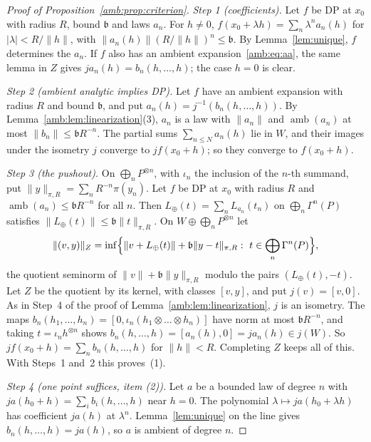 \documentclass[11pt]{amsart}
\theoremstyle{definition}
\theoremstyle{remark}
\numberwithin{equation}{section}
\newcommand{\abs}[1]{\lvert #1\rvert}
\newcommand{\norm}[1]{\lVert #1\rVert}
\theoremstyle{plain}
\theoremstyle{definition}
\theoremstyle{plain}
\begin{document}
\begin{proof}[Proof of Proposition~\ref{amb:prop:criterion}]
\emph{Step 1 (coefficients).} Let $f$ be DP at $x_0$ with radius $R$, bound $\mathfrak b$ and laws $a_n$. For $h\ne0$, $f(x_0+\lambda h)=\sum_n\lambda^na_n(h)$ for $\abs\lambda<R/\norm h$, with $\norm{a_n(h)}(R/\norm h)^n\le \mathfrak b$. By Lemma~\ref{lem:unique}, $f$ determines the $a_n$. If $f$ also has an ambient expansion~\eqref{amb:eq:aa}, the same lemma in $Z$ gives $ja_n(h)=b_n(h,\dots,h)$; the case $h=0$ is clear.

\emph{Step 2 (ambient analytic implies DP).} Let $f$ have an ambient expansion with radius $R$ and bound $\mathfrak b$, and put $a_n(h)=j^{-1}(b_n(h,\dots,h))$. By Lemma~\ref{amb:lem:linearization}(3), $a_n$ is a law with $\norm{a_n}$ and $\operatorname{amb}(a_n)$ at most $\norm{b_n}\le \mathfrak bR^{-n}$. The partial sums $\sum_{n\le N}a_n(h)$ lie in $W$, and their images under the isometry $j$ converge to $jf(x_0+h)$; so they converge to $f(x_0+h)$.

\emph{Step 3 (the pushout).} On $\bigoplus_nP^{\otimes n}$, with $\iota_n$ the inclusion of the $n$\nobreakdash-th summand, put $\norm y_{\pi,R}=\sum_nR^{-n}\pi(y_n)$. Let $f$ be DP at $x_0$ with radius $R$ and $\operatorname{amb}(a_n)\le \mathfrak bR^{-n}$ for all $n$. Then $L_\oplus(t)=\sum_nL_{a_n}(t_n)$ on $\bigoplus_n\Gamma^n(P)$ satisfies $\norm{L_\oplus(t)}\le \mathfrak b\norm t_{\pi,R}$. On $W\oplus\bigoplus_nP^{\otimes n}$ let
\begin{equation}\label{amb:eq:pushout}
 \norm{(v,y)}_Z=\inf\Bigl\{\norm{v+L_\oplus(t)}+\mathfrak b\norm{y-t}_{\pi,R}:\ t\in\bigoplus_n\Gamma^n(P)\Bigr\},
\end{equation}
the quotient seminorm of $\norm v+\mathfrak b\norm y_{\pi,R}$ modulo the pairs $(L_\oplus(t),-t)$. Let $Z$ be the quotient by its kernel, with classes $[v,y]$, and put $j(v)=[v,0]$. As in Step~4 of the proof of Lemma~\ref{amb:lem:linearization}, $j$ is an isometry. The maps $b_n(h_1,\dots,h_n)=[0,\iota_n(h_1\otimes\dots\otimes h_n)]$ have norm at most $\mathfrak bR^{-n}$, and taking $t=\iota_nh^{\otimes n}$ shows $b_n(h,\dots,h)=[a_n(h),0]=ja_n(h)\in j(W)$. So $jf(x_0+h)=\sum_nb_n(h,\dots,h)$ for $\norm h<R$. Completing $Z$ keeps all of this. With Steps~1 and~2 this proves~(1).

\emph{Step 4 (one point suffices, item (2)).} Let $a$ be a bounded law of degree $n$ with $ja(h_0+h)=\sum_ib_i(h,\dots,h)$ near $h=0$. The polynomial $\lambda\mapsto ja(h_0+\lambda h)$ has coefficient $ja(h)$ at $\lambda^n$. Lemma~\ref{lem:unique} on the line gives $b_n(h,\dots,h)=ja(h)$, so $a$ is ambient of degree $n$.
\end{proof}
\end{document}
